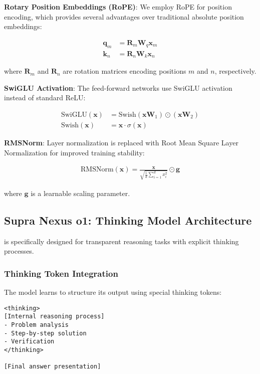 \textbf{Rotary Position Embeddings (RoPE)}: We employ RoPE for position encoding, which provides several advantages over traditional absolute position embeddings:

\begin{align}
\mathbf{q}_m &= \mathbf{R}_m \mathbf{W}_q \mathbf{x}_m \\
\mathbf{k}_n &= \mathbf{R}_n \mathbf{W}_k \mathbf{x}_n
\end{align}

where $\mathbf{R}_m$ and $\mathbf{R}_n$ are rotation matrices encoding positions $m$ and $n$, respectively.

\textbf{SwiGLU Activation}: The feed-forward networks use SwiGLU activation instead of standard ReLU:

\begin{align}
\text{SwiGLU}(\mathbf{x}) &= \text{Swish}(\mathbf{x} \mathbf{W}_1) \odot (\mathbf{x} \mathbf{W}_2) \\
\text{Swish}(\mathbf{x}) &= \mathbf{x} \cdot \sigma(\mathbf{x})
\end{align}

\textbf{RMSNorm}: Layer normalization is replaced with Root Mean Square Layer Normalization for improved training stability:

\begin{align}
\text{RMSNorm}(\mathbf{x}) = \frac{\mathbf{x}}{\sqrt{\frac{1}{d} \sum_{i=1}^{d} x_i^2}} \odot \mathbf{g}
\end{align}

where $\mathbf{g}$ is a learnable scaling parameter.

\subsection{Supra Nexus o1: Thinking Model Architecture}

\supra{} is specifically designed for transparent reasoning tasks with explicit thinking processes.

\subsubsection{Thinking Token Integration}

The model learns to structure its output using special thinking tokens:

\begin{lstlisting}[caption=Thinking token structure,label=lst:thinking-tokens]
<thinking>
[Internal reasoning process]
- Problem analysis
- Step-by-step solution
- Verification
</thinking>

[Final answer presentation]
\end{lstlisting}

